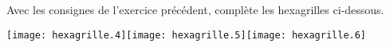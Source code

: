 Avec les consignes de l'exercice précédent, complète les hexagrilles ci-dessous.
\par
\texttt{[image: hexagrille.4]}\kern1cm\texttt{[image: hexagrille.5]}\kern1cm\texttt{[image: hexagrille.6]}
